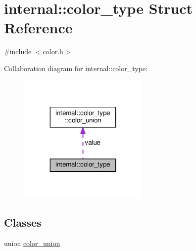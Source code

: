 \hypertarget{structinternal_1_1color__type}{}\section{internal\+:\+:color\+\_\+type Struct Reference}
\label{structinternal_1_1color__type}


{\ttfamily \#include $<$color.\+h$>$}



Collaboration diagram for internal\+:\+:color\+\_\+type\+:
\nopagebreak
\begin{figure}[H]
\begin{center}
\leavevmode
\includegraphics[width=179pt]{structinternal_1_1color__type__coll__graph}
\end{center}
\end{figure}
\subsection*{Classes}
\begin{DoxyCompactItemize}
\item 
union \hyperlink{unioninternal_1_1color__type_1_1color__union}{color\+\_\+union}
\end{DoxyCompactItemize}
